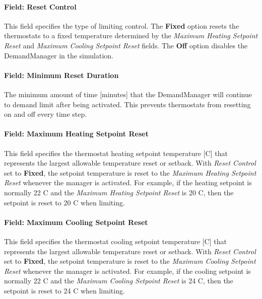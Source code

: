 \paragraph{Field: Reset Control}\label{field-reset-control}

This field specifies the type of limiting control. The \textbf{Fixed} option resets the thermostats to a fixed temperature determined by the \emph{Maximum Heating Setpoint Reset} and \emph{Maximum Cooling Setpoint Reset} fields. The \textbf{Off} option disables the DemandManager in the simulation.

\paragraph{Field: Minimum Reset Duration}\label{field-minimum-reset-duration}

The minimum amount of time {[}minutes{]} that the DemandManager will continue to demand limit after being activated. This prevents thermostats from resetting on and off every time step.

\paragraph{Field: Maximum Heating Setpoint Reset}\label{field-maximum-heating-setpoint-reset}

This field specifies the thermostat heating setpoint temperature {[}C{]} that represents the largest allowable temperature reset or setback. With \emph{Reset Control} set to \textbf{Fixed}, the setpoint temperature is reset to the \emph{Maximum Heating Setpoint Reset} whenever the manager is activated. For example, if the heating setpoint is normally 22 C and the \emph{Maximum Heating Setpoint Reset} is 20 C, then the setpoint is reset to 20 C when limiting.

\paragraph{Field: Maximum Cooling Setpoint Reset}\label{field-maximum-cooling-setpoint-reset}

This field specifies the thermostat cooling setpoint temperature {[}C{]} that represents the largest allowable temperature reset or setback. With \emph{Reset Control} set to \textbf{Fixed}, the setpoint temperature is reset to the \emph{Maximum Cooling Setpoint Reset} whenever the manager is activated. For example, if the cooling setpoint is normally 22 C and the \emph{Maximum Cooling Setpoint Reset} is 24 C, then the setpoint is reset to 24 C when limiting.

